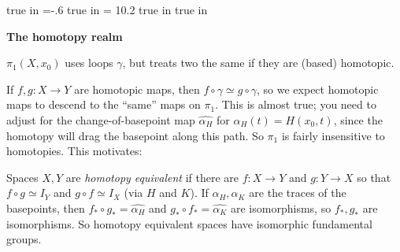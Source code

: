 
\overfullrule=0pt
\parindent=0pt

\nopagenumbers




 true in
\hoffset=-.6 true in
\hsize = 10.2 true in
 true in



\def\cltr{\Red}		  %

\loadmsbm



\def\ctln{\centerline}
\def\u{\underbar}
\def\ssk{\smallskip}
\def\msk{\medskip}
\def\bsk{\bigskip}
\def\hsk{\hskip.1in}
\def\hhsk{\hskip.2in}
\def\dsl{\displaystyle}
\def\hskp{\hskip1.5in}

\def\lra{$\Leftrightarrow$ }
\def\ra{\rightarrow}
\def\mpto{\logmapsto}
\def\pu{\pi_1}
\def\mpu{$\pi_1$}
\def\sig{\Sigma}
\def\msig{$\Sigma$}
\def\ep{\epsilon}
\def\sset{\subseteq}
\def\del{\partial}
\def\inv{^{-1}}
\def\wtl{\widetilde}
\def\del{\partial}
\def\delp{\partial^\prime}
\def\delpp{\partial^{\prime\prime}}
\def\sgn{{\roman{sgn}}}
\def\wtih{\widetilde{H}}
\def\bbz{{\Bbb Z}}
\def\bbr{{\Bbb R}}
\def\rtar{$\Rightarrow$}

{\bf The homotopy realm}

\ssk

$\pi_1(X,x_0)$ uses loops $\gamma$, but treats two the same if they are
(based) homotopic. 

If $f,g:X\ra Y$ are homotopic maps, then 
$f\circ\gamma\simeq g\circ\gamma$, so we expect homotopic maps to
descend to the ``same'' maps on $\pi_1$. This is almost true; you need to 
adjust for the change-of-basepoint map $\widehat{\alpha_H}$ for 
$\alpha_H(t)=H(x_0,t)$, since the homotopy will drag the basepoint
along this path. So $\pi_1$ is fairly insensitive to homotopies.
This motivates:

\ssk

Spaces $X,Y$ are {\it homotopy equivalent} if there are $f:X\ra Y$ and $g:Y\ra X$ so that
$f\circ g\simeq I_Y$ and $g\circ f\simeq I_X$ (via $H$ and $K$). If $\alpha_H,\alpha_K$
are the traces of the basepoints, then 
$f_*\circ g_*=\widehat{\alpha_H}$ and $g_*\circ f_*=\widehat{\alpha_K}$ are isomorphisms,
so $f_*,g_*$ are isomorphisms. So homotopy equivalent spaces have isomorphic
fundamental groups. 


